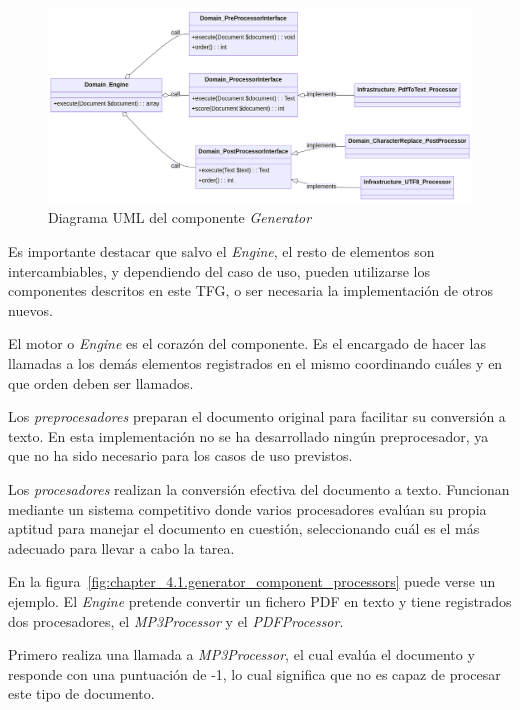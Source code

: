 \begin{figure}[ht]
    \begin{center}
        \includegraphics[width=\textwidth]{./chapter/4/images/chapter_4.1.generator_component_uml}
        \caption{Diagrama UML del componente \textit{Generator}}
        \label{fig:chapter_4.1.generator_component_uml}
    \end{center}
\end{figure}

Es importante destacar que salvo el \textit{Engine}, el resto de elementos son intercambiables, y dependiendo del caso
de uso, pueden utilizarse los componentes descritos en este TFG, o ser necesaria la implementación de otros nuevos.

El motor o \textit{Engine} es el corazón del componente.
Es el encargado de hacer las llamadas a los demás elementos registrados en el mismo coordinando cuáles y en que
orden deben ser llamados.

Los \textit{preprocesadores} preparan el documento original para facilitar su conversión a texto.
En esta implementación no se ha desarrollado ningún preprocesador, ya que no ha sido necesario para los casos de uso
previstos.

Los \textit{procesadores} realizan la conversión efectiva del documento a texto.
Funcionan mediante un sistema competitivo donde varios procesadores evalúan su propia aptitud para manejar el documento
en cuestión, seleccionando cuál es el más adecuado para llevar a cabo la tarea.

En la figura~\ref{fig:chapter_4.1.generator_component_processors} puede verse un ejemplo.
El \textit{Engine} pretende convertir un fichero PDF en texto y tiene registrados dos procesadores, el
\textit{MP3Processor} y el \textit{PDFProcessor}.

Primero realiza una llamada a \textit{MP3Processor}, el cual evalúa el documento y responde con una puntuación
de -1, lo cual significa que no es capaz de procesar este tipo de documento.

